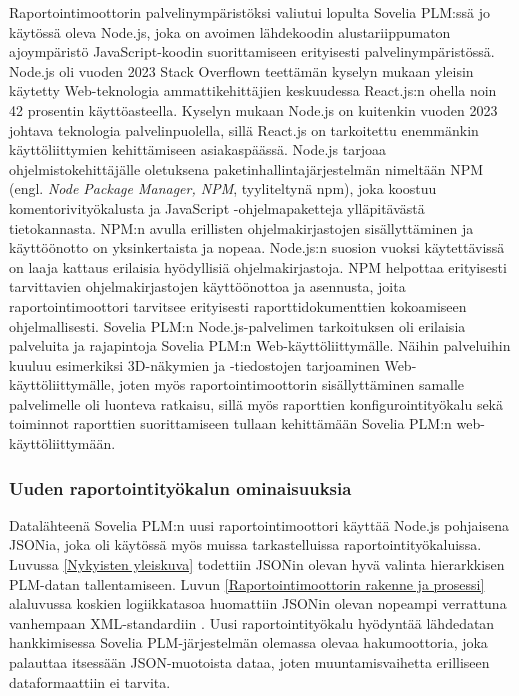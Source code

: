 Raportointimoottorin palvelinympäristöksi valiutui lopulta Sovelia PLM:ssä jo käytössä oleva Node.js, joka on avoimen lähdekoodin alustariippumaton ajoympäristö JavaScript-koodin suorittamiseen erityisesti palvelinympäristössä. Node.js oli vuoden 2023 Stack Overflown teettämän kyselyn mukaan yleisin käytetty Web-teknologia ammattikehittäjien keskuudessa React.js:n ohella noin 42 prosentin käyttöasteella. \cite{stackoverflowStackOverflow} Kyselyn mukaan Node.js on kuitenkin vuoden 2023 johtava teknologia palvelinpuolella, sillä React.js on tarkoitettu enemmänkin käyttöliittymien kehittämiseen asiakaspäässä. Node.js tarjoaa ohjelmistokehittäjälle oletuksena paketinhallintajärjestelmän nimeltään NPM (engl. \textit{Node Package Manager, NPM}, tyyliteltynä npm), joka koostuu komentorivityökalusta ja JavaScript -ohjelmapaketteja ylläpitävästä tietokannasta. NPM:n avulla erillisten ohjelmakirjastojen sisällyttäminen ja käyttöönotto on yksinkertaista ja nopeaa.\cite{npmjsAbout} Node.js:n suosion vuoksi käytettävissä on laaja kattaus erilaisia hyödyllisiä ohjelmakirjastoja. NPM helpottaa erityisesti tarvittavien ohjelmakirjastojen käyttöönottoa ja asennusta, joita raportointimoottori tarvitsee erityisesti raporttidokumenttien kokoamiseen ohjelmallisesti. Sovelia PLM:n Node.js-palvelimen tarkoituksen oli erilaisia palveluita ja rajapintoja Sovelia PLM:n Web-käyttöliittymälle. Näihin palveluihin kuuluu esimerkiksi 3D-näkymien ja -tiedostojen tarjoaminen Web-käyttöliittymälle, joten myös raportointimoottorin sisällyttäminen samalle palvelimelle oli luonteva ratkaisu, sillä myös raporttien konfigurointityökalu sekä toiminnot raporttien suorittamiseen tullaan kehittämään Sovelia PLM:n web-käyttöliittymään.

\subsubsection{Uuden raportointityökalun ominaisuuksia}

Datalähteenä Sovelia PLM:n uusi raportointimoottori käyttää Node.js pohjaisena JSONia, joka oli käytössä myös muissa tarkastelluissa raportointityökaluissa. Luvussa \ref{Nykyisten yleiskuva} todettiin JSONin olevan hyvä valinta hierarkkisen PLM-datan tallentamiseen. Luvun \ref{Raportointimoottorin rakenne ja prosessi} alaluvussa koskien logiikkatasoa huomattiin JSONin olevan nopeampi verrattuna vanhempaan XML-standardiin \cite{nurseitov_comparison_nodate}. Uusi raportointityökalu hyödyntää lähdedatan hankkimisessa Sovelia PLM-järjestelmän olemassa olevaa hakumoottoria, joka palauttaa itsessään JSON-muotoista dataa, joten muuntamisvaihetta erilliseen dataformaattiin ei tarvita.

